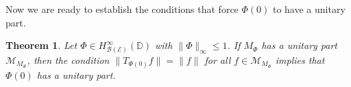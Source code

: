 \documentclass[12pt]{amsart}
\numberwithin{equation}{section}
\newtheorem{thm}[propn]{Theorem}
\newtheorem{lemma}[propn]{Lemma}
\theoremstyle{definition}
\newcommand{\Nat}{\mathbb{N}}
\newcommand{\D}{\mathbb{D}}
\newcommand{\1}{{\mbox{\bf 1}}}
\newcommand{\clb}{\mathcal{B}}
\newcommand{\cle}{\mathcal{E}}
\newcommand{\clf}{\mathcal{F}}
\newcommand{\clh}{\mathcal{H}}
\newcommand{\clk}{\mathcal{K}}
\newcommand{\clm}{\mathcal{M}}
\newcommand{\raro}{\rightarrow}
\begin{document}
Now we are ready to establish the conditions that force $\Phi(0)$ to have a unitary part. 
\begin{thm}\label{analyticmainthm}
Let $\Phi \in H_{\clb(\cle)}^{\infty}(\D)$ with $\|\Phi\|_{\infty} \leq 1$.  If $M_{\Phi}$ has a unitary part $\clm_{M_{\Phi}}$, then the condition $\| T_{\Phi(0)} f \| = \|f\|$ for all $f \in \clm_{M_{\Phi}}$ implies that $\Phi(0)$ has a  unitary part.
\end{thm}
\end{document}
